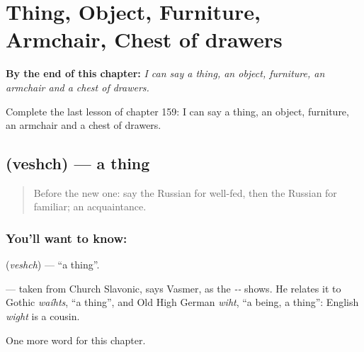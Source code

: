 
\chapter{Thing, Object, Furniture, Armchair, Chest of drawers}
\label{ch:ru-thing-object-furniture-armchair-chest-of-drawers}

\begin{chapteropening}
\textbf{By the end of this chapter:} \emph{I can say a thing, an object, furniture, an armchair and a chest of drawers.}

Complete the last lesson of chapter 159: I can say a thing, an object, furniture, an armchair and a chest of drawers.
\end{chapteropening}

\section[\texorpdfstring{\ru{вещь} (veshch)}{вещь (veshch)}]{ (veshch) — a thing}

\label{lesson:RU-C159-veshch}



\begin{quote}
Before the new one: say the Russian for well-fed, then the Russian for familiar; an acquaintance.
\end{quote}

\subsection*{You'll want to know: }
\textbf{} (\emph{veshch}) — \textquotedblleft{}a thing\textquotedblright{}.

\begin{cousinweb}
\textbf{} — taken from Church Slavonic, says Vasmer, as the \emph{--} shows. He relates it to Gothic \emph{waíhts}, \textquotedblleft{}a thing\textquotedblright{}, and Old High German \emph{wiht}, \textquotedblleft{}a being, a thing\textquotedblright{}: English \emph{wight} is a cousin.
\end{cousinweb}

\begin{grammarlens}[title={What you've built}]
One more word for this chapter.
\end{grammarlens}

